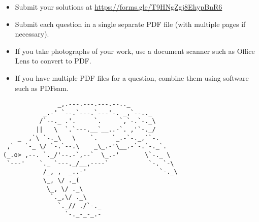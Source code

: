 \documentclass{article}
\begin{document}
\vfill
\begin{itemize}
	\item Submit your solutions at \href{https://forms.gle/T9HNgZgj8EhypBnR6}{https://forms.gle/T9HNgZgj8EhypBnR6}
	\item Submit each question in a single separate PDF file (with multiple pages if necessary).
	\item If you take photographs of your work, use a document scanner such as Office Lens to convert to PDF.
	\item If you have multiple PDF files for a question, combine them using software such as PDFsam.
\end{itemize}

\vfill
\centering
\small
\begin{BVerbatim}
               _,.---.---.---.--.._ 
           _.-' `--.`---.`---'-. _,`--.._
          /`--._ .'.     `.     `,`-.`-._\
         ||   \  `.`---.__`__..-`. ,'`-._/
    _  ,`\ `-._\   \    `.    `_.-`-._,``-.
 ,`   `-_ \/ `-.`--.\    _\_.-'\__.-`-.`-._`.
(_.o> ,--. `._/'--.-`,--`  \_.-'       \`-._ \
 `---'    `._ `---._/__,----`           `-. `-\
           /_, ,  _..-'                    `-._\
           \_, \/ ._(
            \_, \/ ._\
             `._,\/ ._\
               `._// ./`-._
                 `-._-_-_.-
\end{BVerbatim}
\end{document}
